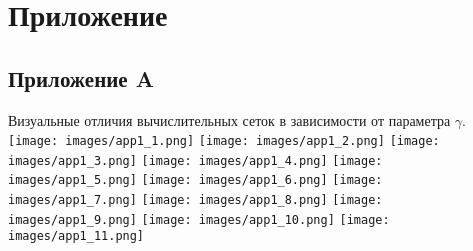 \section*{\large{Приложение}}
\label{appendix}
\subsection*{\large{Приложение A}}
\label{appendix:meshes}
Визуальные отличия вычислительных сеток в зависимости от параметра $\gamma$.
\texttt{[image: images/app1\_1.png]}
\texttt{[image: images/app1\_2.png]}
\texttt{[image: images/app1\_3.png]}
\texttt{[image: images/app1\_4.png]}
\texttt{[image: images/app1\_5.png]}
\texttt{[image: images/app1\_6.png]}
\texttt{[image: images/app1\_7.png]}
\texttt{[image: images/app1\_8.png]}
\texttt{[image: images/app1\_9.png]}
\texttt{[image: images/app1\_10.png]}
\texttt{[image: images/app1\_11.png]}